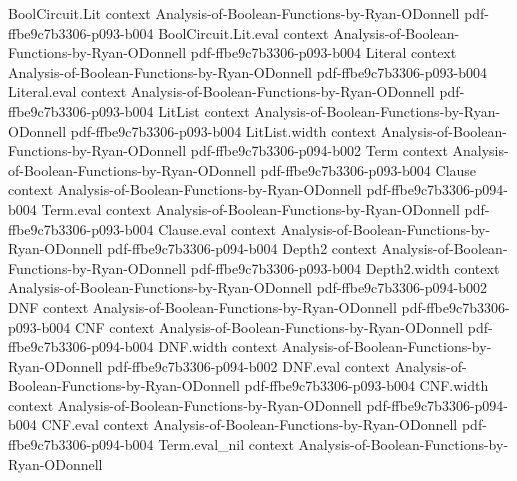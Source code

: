 \begin{lemma}
\label{BoolBLR.BLR_completeness_aux_h_linear}
\leanok
{}
\proofstep
  {BoolCircuit.Lit}
  {context}
  {Analysis-of-Boolean-Functions-by-Ryan-ODonnell}
  {pdf-ffbe9c7b3306-p093-b004}
\proofstep
  {BoolCircuit.Lit.eval}
  {context}
  {Analysis-of-Boolean-Functions-by-Ryan-ODonnell}
  {pdf-ffbe9c7b3306-p093-b004}
\proofstep
  {Literal}
  {context}
  {Analysis-of-Boolean-Functions-by-Ryan-ODonnell}
  {pdf-ffbe9c7b3306-p093-b004}
\proofstep
  {Literal.eval}
  {context}
  {Analysis-of-Boolean-Functions-by-Ryan-ODonnell}
  {pdf-ffbe9c7b3306-p093-b004}
\proofstep
  {LitList}
  {context}
  {Analysis-of-Boolean-Functions-by-Ryan-ODonnell}
  {pdf-ffbe9c7b3306-p093-b004}
\proofstep
  {LitList.width}
  {context}
  {Analysis-of-Boolean-Functions-by-Ryan-ODonnell}
  {pdf-ffbe9c7b3306-p094-b002}
\proofstep
  {Term}
  {context}
  {Analysis-of-Boolean-Functions-by-Ryan-ODonnell}
  {pdf-ffbe9c7b3306-p093-b004}
\proofstep
  {Clause}
  {context}
  {Analysis-of-Boolean-Functions-by-Ryan-ODonnell}
  {pdf-ffbe9c7b3306-p094-b004}
\proofstep
  {Term.eval}
  {context}
  {Analysis-of-Boolean-Functions-by-Ryan-ODonnell}
  {pdf-ffbe9c7b3306-p093-b004}
\proofstep
  {Clause.eval}
  {context}
  {Analysis-of-Boolean-Functions-by-Ryan-ODonnell}
  {pdf-ffbe9c7b3306-p094-b004}
\proofstep
  {Depth2}
  {context}
  {Analysis-of-Boolean-Functions-by-Ryan-ODonnell}
  {pdf-ffbe9c7b3306-p093-b004}
\proofstep
  {Depth2.width}
  {context}
  {Analysis-of-Boolean-Functions-by-Ryan-ODonnell}
  {pdf-ffbe9c7b3306-p094-b002}
\proofstep
  {DNF}
  {context}
  {Analysis-of-Boolean-Functions-by-Ryan-ODonnell}
  {pdf-ffbe9c7b3306-p093-b004}
\proofstep
  {CNF}
  {context}
  {Analysis-of-Boolean-Functions-by-Ryan-ODonnell}
  {pdf-ffbe9c7b3306-p094-b004}
\proofstep
  {DNF.width}
  {context}
  {Analysis-of-Boolean-Functions-by-Ryan-ODonnell}
  {pdf-ffbe9c7b3306-p094-b002}
\proofstep
  {DNF.eval}
  {context}
  {Analysis-of-Boolean-Functions-by-Ryan-ODonnell}
  {pdf-ffbe9c7b3306-p093-b004}
\proofstep
  {CNF.width}
  {context}
  {Analysis-of-Boolean-Functions-by-Ryan-ODonnell}
  {pdf-ffbe9c7b3306-p094-b004}
\proofstep
  {CNF.eval}
  {context}
  {Analysis-of-Boolean-Functions-by-Ryan-ODonnell}
  {pdf-ffbe9c7b3306-p094-b004}
\proofstep
  {Term.eval_nil}
  {context}
  {Analysis-of-Boolean-Functions-by-Ryan-ODonnell}

\end{lemma}
